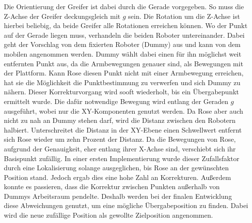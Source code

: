 Die Orientierung der Greifer ist dabei durch die Gerade vorgegeben. So muss die Z-Achse der Greifer deckungsgleich mit $g$ sein. Die Rotation um die Z-Achse ist hierbei beliebig, da beide Greifer alle Rotationen erreichen können. Wo der Punkt auf der Gerade liegen muss, verhandeln die beiden Roboter untereinander. Dabei geht der Vorschlag von dem fixierten Roboter (Dummy) aus und kann von dem mobilen angenommen werden. Dummy wählt dabei einen für ihn möglichst weit entfernten Punkt aus, da die Armbewegungen genauer sind, als Bewegungen mit der Plattform. Kann Rose diesen Punkt nicht mit einer Armbewegung erreichen, hat sie die Möglichkeit die Punktbestimmung zu verwerfen und sich Dummy zu nähern.  Dieser Korrekturvorgang wird sooft wiederholt, bis ein Übergabepunkt ermittelt wurde. Die dafür notwendige Bewegung wird entlang der Geraden $g$ ausgeführt, wobei nur die XY-Komponenten genutzt werden. Da Rose aber auch nicht zu nah an Dummy stehen darf, wird die Distanz zwischen den Robotern halbiert. Unterschreitet die Distanz in der XY-Ebene einen Schwellwert entfernt sich Rose wieder um zehn Prozent der Distanz. Da die Bewegungen von Rose, aufgrund der Genauigkeit, eher entlang ihrer X-Achse sind, verschiebt sich ihr Basispunkt zufällig. In einer ersten Implementierung wurde dieser Zufallsfaktor durch eine Lokalisierung solange ausgeglichen, bis Rose an der gewünschten Position stand. Jedoch ergab dies eine hohe Zahl an Korrekturen. Außerdem konnte es passieren, dass die Korrektur zwischen Punkten außerhalb von Dummys Arbeitsraum pendelte. Deshalb werden bei der finalen Entwicklung diese Abweichungen genutzt, um eine mögliche Übergabeposition zu finden. Dabei wird die neue zufällige Position als gewollte Zielposition angenommen.